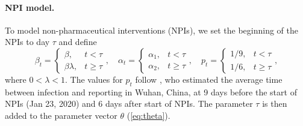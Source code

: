 \documentclass[12pt]{extarticle}
\begin{document}
\paragraph*{NPI model.}
To model non-pharmaceutical interventions (NPIs), we set the beginning of the NPIs to day $\tau$ and define
\begin{equation} \label{eq:NPI_model}
\beta_t = \begin{cases} 
  \beta, & t < \tau \\ %
  \beta \lambda, & t \ge \tau
\end{cases},
\quad
\alpha_t = \begin{cases} 
  \alpha_1, & t < \tau \\ %
  \alpha_2, & t \ge \tau
\end{cases},
\quad
p_t = \begin{cases} 
  1/9, & t < \tau \\ %
  1/6, & t \ge \tau
\end{cases},
\end{equation}
where $0 < \lambda < 1$.
The values for $p_t$ follow \citet{Li2020}, who estimated the average time between infection and reporting in Wuhan, China, at 9 days before the start of NPIs (Jan 23, 2020) and 6 days after start of NPIs.
The parameter $\tau$ is then added to the parameter vector $\theta$ (\autoref{eq:theta}).



\end{document}
